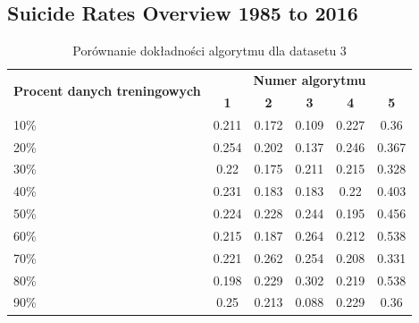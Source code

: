 \documentclass[a4paper,11pt]{article}
\begin{document}
\subsection{Suicide Rates Overview 1985 to 2016} 

\begin{table}[H]
\centering
\begin{tabular}{|l|c|c|c|c|c|}
\hline
\multicolumn{1}{|c|}{\multirow{2}{*}{\textbf{Procent danych treningowych}}} & \multicolumn{5}{c|}{\textbf{Numer algorytmu}}                       \\ \cline{2-6}
\multicolumn{1}{|c|}{}                                                      & \textbf{1} & \textbf{2} & \textbf{3} & \textbf{4} & \textbf{5} \\ \hline
10\%                                                                   & 0.211      & 0.172      & 0.109      & 0.227      & 0.36       \\ \hline
20\%                                                                   & 0.254      & 0.202      & 0.137      & 0.246      & 0.367      \\ \hline
30\%                                                                   & 0.22       & 0.175      & 0.211      & 0.215      & 0.328      \\ \hline
40\%                                                                   & 0.231      & 0.183      & 0.183      & 0.22       & 0.403      \\ \hline
50\%                                                                   & 0.224      & 0.228      & 0.244      & 0.195      & 0.456      \\ \hline
60\%                                                                   & 0.215      & 0.187      & 0.264      & 0.212      & 0.538      \\ \hline
70\%                                                                   & 0.221      & 0.262      & 0.254      & 0.208      & 0.331      \\ \hline
80\%                                                                   & 0.198      & 0.229      & 0.302      & 0.219      & 0.538      \\ \hline
90\%                                                                   & 0.25       & 0.213      & 0.088      & 0.229      & 0.36       \\ \hline
\end{tabular}
\caption{Porównanie dokładności algorytmu dla datasetu 3}
\label{tab:dataset3}
\end{table}
\newpage
\end{document}
